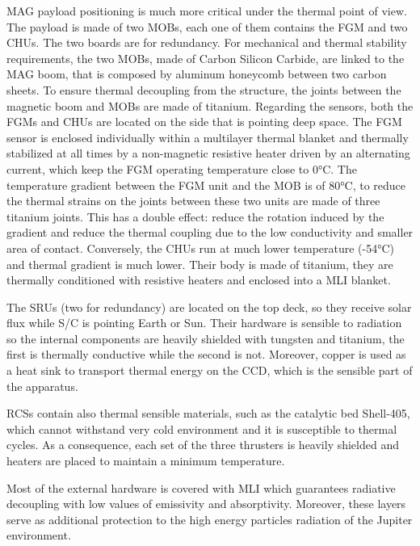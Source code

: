 \begin{itemize}
    MAG payload positioning is much more critical under the thermal point of view. The payload is made of two MOBs, each one of them contains the FGM and two CHUs. The two boards are for redundancy. 
    For mechanical and thermal stability requirements, the two MOBs, made of Carbon Silicon Carbide, are linked to the MAG boom, that is composed by aluminum honeycomb between two carbon sheets. To ensure thermal decoupling from the structure, the joints between the magnetic boom and MOBs are made of titanium. 
    Regarding the sensors, both the FGMs and CHUs are located on the side that is pointing deep space.
    The FGM sensor is enclosed individually within a multilayer thermal blanket and thermally stabilized at all times by a non-magnetic resistive heater driven by an alternating current, which keep the FGM operating temperature close to 0°C. The temperature gradient between the FGM unit and the MOB is of 80°C, to reduce the thermal strains on the joints between these two units are made of three titanium joints.  This has a double effect: reduce the rotation induced by the gradient and reduce the thermal coupling due to the low conductivity and smaller area of contact.
    Conversely, the CHUs run at much lower temperature (-54°C) and thermal gradient is much lower. Their body is made of titanium, they are thermally conditioned with resistive heaters and enclosed into a MLI blanket.  

    The SRUs (two for redundancy) are located on the top deck, so they receive solar flux while S/C is pointing Earth or Sun. Their hardware is sensible to radiation so the internal components are heavily shielded with tungsten and titanium, the first is thermally conductive while the second is not. 
    Moreover, copper is used as a heat sink to transport thermal energy on the CCD, which is the sensible part of the apparatus.\cite{MAG_info}

    RCSs contain also thermal sensible materials, such as the catalytic bed Shell-405, which cannot withstand very cold environment and it is susceptible to thermal cycles. As a consequence, each set of the three thrusters is heavily shielded and heaters are placed to maintain a minimum temperature. \cite{Leros}

    Most of the external hardware is covered with MLI which guarantees radiative decoupling with low values of emissivity and absorptivity. Moreover, these layers serve as additional protection to the high energy particles radiation of the Jupiter environment.


\end{itemize}
